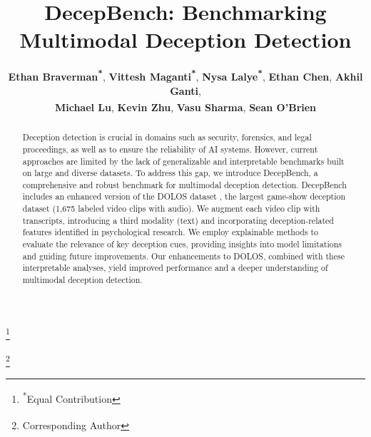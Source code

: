 \documentclass[11pt]{article}
\title{DecepBench: Benchmarking Multimodal Deception Detection}
\author{
  \textbf{Ethan Braverman\textsuperscript{*}},
  \textbf{Vittesh Maganti\textsuperscript{*}},
  \textbf{Nysa Lalye\textsuperscript{*}},
  \textbf{Ethan Chen},
  \textbf{Akhil Ganti},
  \\
  \textbf{Michael Lu\textsuperscript{\ddag}},
  \textbf{Kevin Zhu\textsuperscript{\ddag}},
  \textbf{Vasu Sharma\textsuperscript{\ddag}},
  \textbf{Sean O'Brien\textsuperscript{\ddag}}
}
\newcommand\blfootnote[1]{%
  \begingroup
  \renewcommand\thefootnote{}\footnote{#1}%
  \addtocounter{footnote}{-1}%
  \endgroup
}
\begin{document}
\maketitle
\blfootnote{\textsuperscript{*}Equal Contribution}
\blfootnote{\textsuperscript{\ddag}Corresponding Author}

\begin{abstract}
\noindent
Deception detection is crucial in domains such as security, forensics, and legal proceedings, as well as to ensure the reliability of AI systems. However, current approaches are limited by the lack of generalizable and interpretable benchmarks built on large and diverse datasets. To address this gap, we introduce DecepBench, a comprehensive and robust benchmark for multimodal deception detection. DecepBench includes an enhanced version of the DOLOS dataset \citep{guo2023audiovisualdeceptiondetectiondolos}, the largest game-show deception dataset (1,675 labeled video clips with audio). We augment each video clip with transcripts, introducing a third modality (text) and incorporating deception-related features identified in psychological research. We employ explainable methods to evaluate the relevance of key deception cues, providing insights into model limitations and guiding future improvements. Our enhancements to DOLOS, combined with these interpretable analyses, yield improved performance and a deeper understanding of multimodal deception detection.
\end{abstract}

\end{document}
